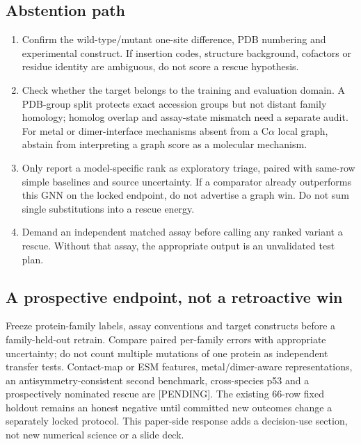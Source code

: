 \subsection{Abstention path}
\begin{enumerate}
\item Confirm the wild-type/mutant one-site difference, PDB numbering and experimental construct. If insertion codes, structure background, cofactors or residue identity are ambiguous, do not score a rescue hypothesis.
\item Check whether the target belongs to the training and evaluation domain. A PDB-group split protects exact accession groups but not distant family homology; homolog overlap and assay-state mismatch need a separate audit. For metal or dimer-interface mechanisms absent from a C$\alpha$ local graph, abstain from interpreting a graph score as a molecular mechanism.
\item Only report a model-specific rank as exploratory triage, paired with same-row simple baselines and source uncertainty. If a comparator already outperforms this GNN on the locked endpoint, do not advertise a graph win. Do not sum single substitutions into a rescue energy.
\item Demand an independent matched assay before calling any ranked variant a rescue. Without that assay, the appropriate output is an unvalidated test plan.
\end{enumerate}

\subsection{A prospective endpoint, not a retroactive win}
Freeze protein-family labels, assay conventions and target constructs before a family-held-out retrain. Compare paired per-family errors with appropriate uncertainty; do not count multiple mutations of one protein as independent transfer tests. Contact-map or ESM features, metal/dimer-aware representations, an antisymmetry-consistent second benchmark, cross-species p53 and a prospectively nominated rescue are [PENDING]. The existing 66-row fixed holdout remains an honest negative until committed new outcomes change a separately locked protocol. This paper-side response adds a decision-use section, not new numerical science or a slide deck.
